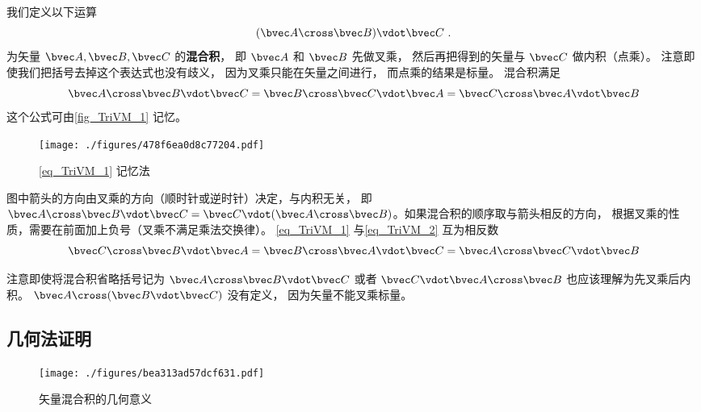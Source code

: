 
我们定义以下运算
\begin{equation}
(\bvec A \cross \bvec B) \vdot \bvec C~.
\end{equation}
为矢量 $\bvec A, \bvec B, \bvec C$ 的\textbf{混合积}， 即 $\bvec A$ 和 $\bvec B$ 先做叉乘， 然后再把得到的矢量与 $\bvec C$ 做内积（点乘）。 注意即使我们把括号去掉这个表达式也没有歧义， 因为叉乘只能在矢量之间进行， 而点乘的结果是标量。 混合积满足
\begin{equation}\label{eq_TriVM_1}
\bvec A \cross \bvec B \vdot \bvec C = \bvec B \cross \bvec C \vdot \bvec A = \bvec C \cross \bvec A \vdot \bvec B
\end{equation} 
这个公式可由\autoref{fig_TriVM_1} 记忆。
\begin{figure}[ht]
\centering %
\texttt{[image: ./figures/478f6ea0d8c77204.pdf]}
\caption{\autoref{eq_TriVM_1} 记忆法}\label{fig_TriVM_1}
\end{figure}
图中箭头的方向由叉乘的方向（顺时针或逆时针）决定，与内积无关， 即 $\bvec A\cross \bvec B \vdot \bvec C = \bvec C \vdot (\bvec A \cross \bvec B)$。如果混合积的顺序取与箭头相反的方向， 根据叉乘的性质，需要在前面加上负号（叉乘不满足乘法交换律）。 \autoref{eq_TriVM_1} 与\autoref{eq_TriVM_2} 互为相反数
\begin{equation}\label{eq_TriVM_2}
\bvec C \cross \bvec B \vdot \bvec A = \bvec B \cross \bvec A \vdot \bvec C = \bvec A \cross \bvec C \vdot \bvec B
\end{equation}

注意即使将混合积省略括号记为 $\bvec A \cross \bvec B \vdot \bvec C$ 或者 $\bvec C \vdot \bvec A \cross \bvec B$ 也应该理解为先叉乘后内积。 $\bvec A \cross (\bvec B \vdot \bvec C)$ 没有定义， 因为矢量不能叉乘标量。

\subsection{几何法证明}

\begin{figure}[ht]
\centering
\texttt{[image: ./figures/bea313ad57dcf631.pdf]}
\caption{矢量混合积的几何意义} \label{fig_TriVM_2}
\end{figure}

